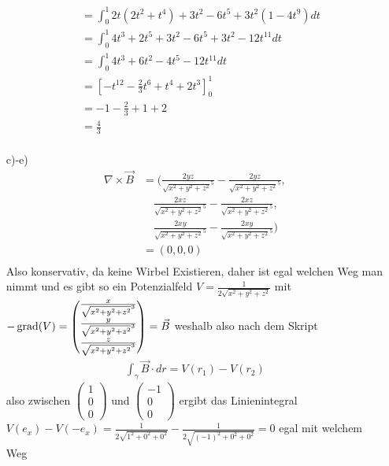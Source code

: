 \documentclass[sectionformat=aufgabe]{gadsescript}
\begin{document}
\begin{enumerate}[label=\alph*)]
\begin{align*}
			~&= \int_{0}^{1} 2t(2t^2 + t^4) + 3 t^2 - 6 t^5 + 3t^2(1 - 4 t^9) dt \\
			~&= \int_{0}^{1} 4t^3 + 2t^5 + 3 t^2 - 6 t^5 + 3t^2 - 12 t^11 dt \\
			~&= \int_{0}^{1} 4t^3 + 6 t^2 - 4 t^5 - 12 t^11 dt \\
			~&= \left[ - t^12 - \frac{ 2 }{ 3 } t^6 + t^4 + 2t^3 \right]_0^1 \\
			~&= -1 - \frac{ 2 }{ 3 }  + 1 + 2 \\
			~&= \frac{ 4 }{ 3 }  \\
		\end{align*}
	\item[c)-e)]
		\begin{align*}
			\nabla \times \vec B &= \Bigg( \frac{ 2yz }{ \sqrt{x^2 + y^2 + z^2}^5 } - \frac{ 2yz }{ \sqrt{x^2 + y^2 + z^2}^5 },\\
			~&\quad\frac{ 2xz }{ \sqrt{x^2 + y^2 + z^2}^5 } - \frac{ 2xz }{ \sqrt{x^2 + y^2 + z^2}^5 },\\
			~&\quad\frac{ 2xy }{ \sqrt{x^2 + y^2 + z^2}^5 } - \frac{ 2xy }{ \sqrt{x^2 + y^2 + z^2}^5 } \Bigg)\\
			~&= (0, 0, 0) \\
		\end{align*}
		Also konservativ, da keine Wirbel Existieren, daher ist egal welchen Weg man nimmt und
		es gibt so ein Potenzialfeld $ V = \frac{ 1 }{ 2\sqrt{x^2 + y^2 + z^2}  } $ mit $ -\operatorname{grad}(V) = \begin{pmatrix} \frac{ x }{ \sqrt{x^2 + y^2 + z^2}^3 }\\\frac{ y }{ \sqrt{x^2 + y^2 + z^2}^3 }\\\frac{ z }{ \sqrt{x^2 + y^2 + z^2}^3 }  \end{pmatrix} = \vec B $
		weshalb also nach dem Skript
		\begin{align*}
			\int_{\gamma} \vec B \cdot dr = V(r_1) - V(r_2)
		\end{align*}
		also zwischen $ \begin{pmatrix} 1\\0\\0 \end{pmatrix} $ und $ \begin{pmatrix} -1\\0\\0 \end{pmatrix}  $ ergibt das Linienintegral
		$ V(e_x) - V(-e_x) = \frac{ 1 }{ 2\sqrt{1^2 + 0^2 + 0^2} } - \frac{ 1 }{ 2\sqrt{(-1)^2 + 0^2 + 0^2}  } = 0 $ egal mit welchem Weg

\end{enumerate}
\end{document}
